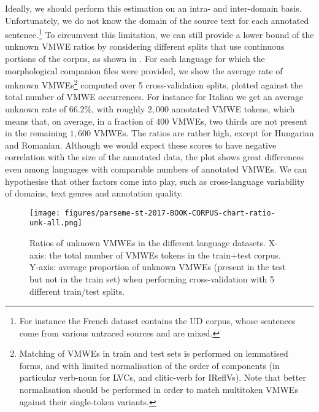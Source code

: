 \documentclass[output=paper,
modfonts,
]{langscibook}
\begin{document}
Ideally, we should perform this estimation on an intra- and inter-domain basis. 
Unfortunately, we do not know the domain of the source text for each annotated sentence.\footnote{For instance the French dataset contains the UD corpus, whose sentences come from various untraced sources and are mixed.} To circumvent this limitation, we can still provide a lower bound of the unknown VMWE ratios by considering different splits that use continuous portions of the corpus, as shown in . For each language for which the morphological companion files were provided,
we show the average rate of unknown %
VMWEs\footnote{Matching of VMWEs in train and test sets is performed on lemmatised forms, and with limited normalisation of the order of components (in particular verb-noun for LVCs, and clitic-verb for IReflVs). Note that better normalisation should be performed in order to match multitoken VMWEs against their single-token variants.} computed over 5 cross-validation splits, plotted against the total number of VMWE occurrences. For instance for Italian we get an average unknown rate of $66.2\%$, with roughly $2{,}000$ annotated VMWE tokens, which means that, on average, in a fraction of $400$ VMWEs, two thirds are not present in the remaining $1{,}600$ VMWEs. %
The ratios are rather high, except for Hungarian and Romanian. Although we would expect these scores to have negative correlation with the size of the annotated data, the plot shows great differences even among languages with comparable numbers of annotated VMWEs. We can hypothesise that other factors come into play, such as cross-language variability of domains, text genres and annotation quality.  

\begin{figure}
\centering
\texttt{[image: figures/parseme-st-2017-BOOK-CORPUS-chart-ratio-unk-all.png]}
\caption{Ratios of unknown VMWEs in the different language datasets. X-axis: the total number of VMWEs tokens in the train+test corpus. Y-axis: average proportion of unknown VMWEs (present in the test but not in the train set) when performing %
cross-validation with 5 different train/test splits.}
\label{fig:unknown-ratios}
\end{figure}
\end{document}
